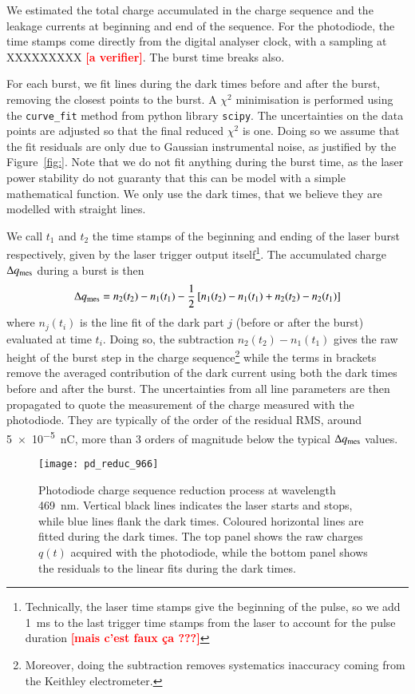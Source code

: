 \documentclass[onecolumn]{aa}
\newcommand{\todo}[1]{\textbf{\textcolor{red}{[#1]}}\xspace}
\begin{document}
We estimated the total charge accumulated in the charge sequence and the leakage currents at beginning and end of the sequence. For the photodiode, the time stamps come directly from the digital analyser clock, with a sampling at XXXXXXXXX \todo{a verifier}. The burst time breaks also. %

For each burst, we fit lines during the dark times before and after the burst, removing the closest points to the burst. A $\chi^2$ minimisation is performed using the \texttt{curve\_fit} method from python library \texttt{scipy}. The uncertainties on the data points are adjusted so that the final reduced $\chi^2$ is one. Doing so we assume that the fit residuals are only due to Gaussian instrumental noise, as justified by the Figure~\ref{fig:}. Note that we do not fit anything during the burst time, as the laser power stability do not guaranty that this can be model with a simple mathematical function. We only use the dark times, that we believe they are modelled with straight lines.

We call $t_1$ and $t_2$ the time stamps of the beginning and ending of the laser burst respectively, given by the laser trigger output itself\footnote{Technically, the laser time stamps give the beginning of the pulse, so we add \SI{1}{\ms} to the last trigger time stamps from the laser to account for the pulse duration \todo{mais c'est faux ça ???}}. The accumulated charge $\Delta q_{\rm mes}$ during a burst is then
        $$\Delta q_{\rm mes} = n_2(t_2) - n_1(t_1) - \frac{1}{2} \left[n_1(t_2) - n_1(t_1) + n_2(t_2) - n_2(t_1)  \right]$$
where $n_j(t_i)$ is the line fit of the dark part $j$ (before or after the burst) evaluated at time $t_i$. Doing so, the subtraction $n_2(t_2) - n_1(t_1)$ gives the raw height of the burst step in the charge sequence\footnote{Moreover, doing the subtraction removes systematics inaccuracy coming from the Keithley electrometer.} while the terms in brackets remove the averaged contribution of the dark current using both the dark times before and after the burst. The uncertainties from all line parameters are then propagated to quote the measurement of the charge measured with the photodiode. They are typically of the order of the residual RMS, around \SI{5e-5}{\nano\coulomb}, more than 3 orders of magnitude below the typical $\Delta q_{\rm mes}$ values.



\begin{figure}[!h]
\centering
\texttt{[image: pd\_reduc\_966]}
\caption{Photodiode charge sequence reduction process at wavelength \SI{469}{\nm}. Vertical black lines indicates the laser starts and stops, while blue lines flank the dark times. Coloured horizontal lines are fitted during the dark times. The top panel shows the raw charges $q(t)$ acquired with the photodiode, while the bottom panel shows the residuals to the linear fits during the dark times.}
\end{figure}
\end{document}
